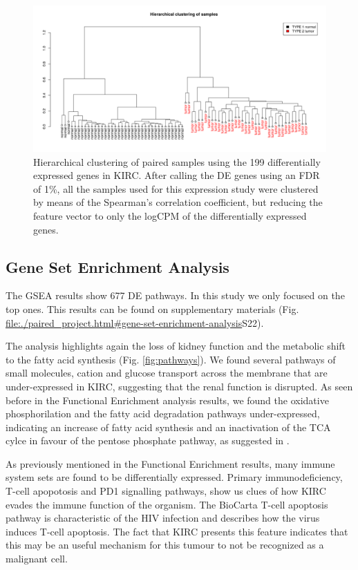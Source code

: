 \documentclass[9pt,twocolumn,twoside]{gsajnl}
\begin{document}
\begin{figure}[htbp]
\centering
\includegraphics[width=\textwidth]{figures/fig2.png}
\caption{Hierarchical clustering of paired samples using the 199 differentially expressed genes in KIRC. After calling the DE genes using an FDR of 1\%, all the samples used for this expression study were clustered by means of the Spearman's correlation coefficient, but reducing the feature vector to only the logCPM of the differentially expressed genes. }%
\label{fig:hierarchical}
\end{figure}


\subsection*{Gene Set Enrichment Analysis}
The GSEA results show 677 DE pathways. In this study we only focused on the top ones. This results can be found on supplementary materials (Fig. \url{file:./paired_project.html\#gene-set-enrichment-analysis}{S22}).

The analysis highlights again the loss of kidney function and the metabolic shift to the fatty acid synthesis  (Fig. \ref{fig:pathways}). We found several pathways of small molecules, cation and glucose transport across the membrane that are under-expressed in KIRC, suggesting that the renal function is disrupted. As seen before in the Functional Enrichment analysis results, we found the oxidative phosphorilation and the fatty acid degradation pathways under-expressed, indicating an increase of fatty acid synthesis and  an inactivation of the TCA cylce in favour of the pentose phosphate pathway, as suggested in \citep{Creighton2013}. 

As previously mentioned in the Functional Enrichment results, many immune system sets are found to be differentially expressed. Primary immunodeficiency, T-cell apopotosis and PD1 signalling pathways, show us clues of how KIRC evades the immune function of the organism. The BioCarta T-cell apoptosis pathway is characteristic of the HIV infection and describes how the virus induces T-cell apoptosis. The fact that KIRC presents this feature indicates that this may be an useful mechanism for this tumour to not be recognized as a malignant cell.
\end{document}
